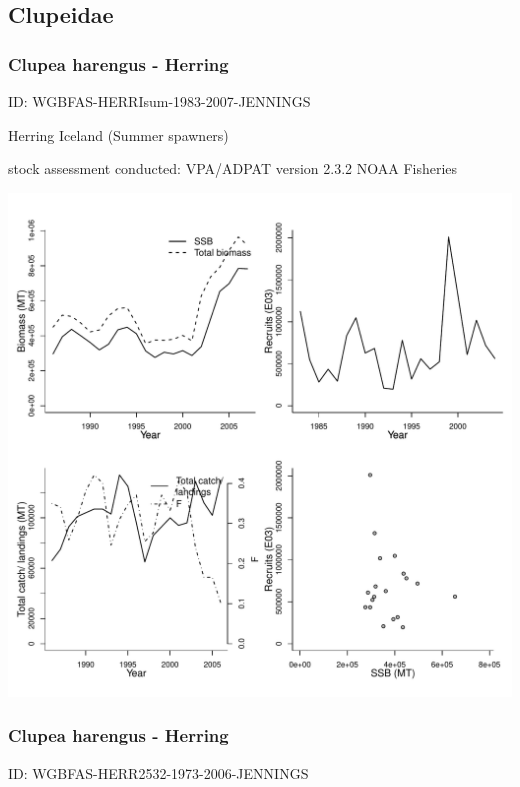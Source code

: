 \subsection{Clupeidae}

\subsubsection{Clupea harengus - Herring}
ID: WGBFAS-HERRIsum-1983-2007-JENNINGS

Herring Iceland (Summer spawners) 

stock assessment conducted: VPA/ADPAT version 2.3.2 NOAA Fisheries 
\begin{center}
\vspace{-0.2cm}\includegraphics[scale=0.65]{../tex/figures/plot-WGBFAS-HERRIsum-1983-2007-JENNINGS.pdf}
\end{center}

\newpage
\subsubsection{Clupea harengus - Herring}
ID: WGBFAS-HERR2532-1973-2006-JENNINGS

